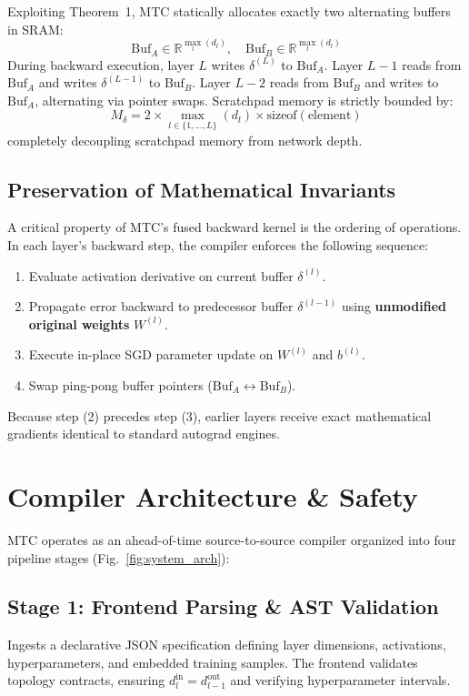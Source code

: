 \documentclass[conference]{IEEEtran}
\begin{document}
Exploiting Theorem~1, MTC statically allocates exactly two alternating buffers in SRAM:
\begin{equation}
    \text{Buf}_A \in \mathbb{R}^{\max_l(d_l)}, \quad \text{Buf}_B \in \mathbb{R}^{\max_l(d_l)}
\end{equation}
During backward execution, layer $L$ writes $\delta^{(L)}$ to $\text{Buf}_A$. Layer $L-1$ reads from $\text{Buf}_A$ and writes $\delta^{(L-1)}$ to $\text{Buf}_B$. Layer $L-2$ reads from $\text{Buf}_B$ and writes to $\text{Buf}_A$, alternating via pointer swaps. Scratchpad memory is strictly bounded by:
\begin{equation}
    M_{\delta} = 2 \times \max_{l \in \{1, \dots, L\}} (d_l) \times \text{sizeof}(\text{element})
\end{equation}
completely decoupling scratchpad memory from network depth.

\subsection{Preservation of Mathematical Invariants}
A critical property of MTC's fused backward kernel is the ordering of operations. In each layer's backward step, the compiler enforces the following sequence:
\begin{enumerate}
    \item Evaluate activation derivative on current buffer $\delta^{(l)}$.
    \item Propagate error backward to predecessor buffer $\delta^{(l-1)}$ using \textbf{unmodified original weights} $W^{(l)}$.
    \item Execute in-place SGD parameter update on $W^{(l)}$ and $b^{(l)}$.
    \item Swap ping-pong buffer pointers ($\text{Buf}_A \leftrightarrow \text{Buf}_B$).
\end{enumerate}
Because step (2) precedes step (3), earlier layers receive exact mathematical gradients identical to standard autograd engines.

\section{Compiler Architecture \& Safety}

MTC operates as an ahead-of-time source-to-source compiler organized into four pipeline stages (Fig.~\ref{fig:system_arch}):

\subsection{Stage 1: Frontend Parsing \& AST Validation}
Ingests a declarative JSON specification defining layer dimensions, activations, hyperparameters, and embedded training samples. The frontend validates topology contracts, ensuring $d_l^{\text{in}} = d_{l-1}^{\text{out}}$ and verifying hyperparameter intervals.
\end{document}
